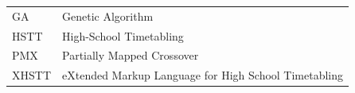 	\begin{tabular}{ll}
		GA		& Genetic Algorithm \\
		HSTT	& High-School Timetabling \\
		PMX		& Partially Mapped Crossover \\
		XHSTT	& eXtended Markup Language for High School Timetabling %
	\end{tabular}

